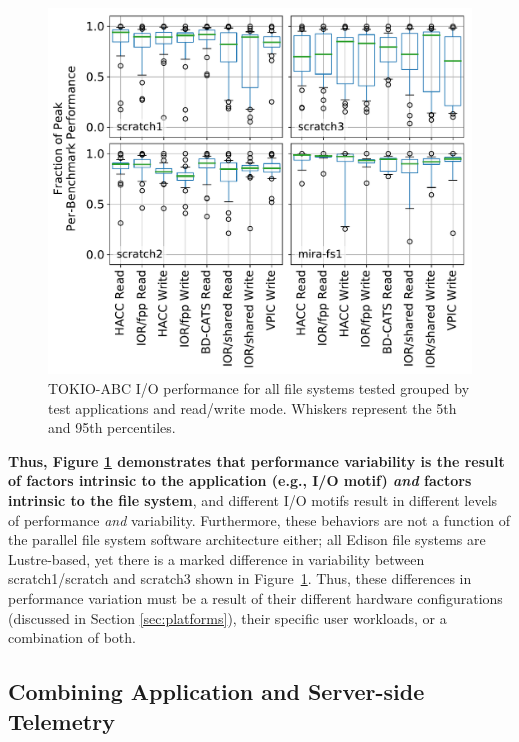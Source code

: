 \begin{figure}[t]
    \centering
    \includegraphics[width=1.0\columnwidth]{figs/perf-boxplots.pdf}
    \caption{TOKIO-ABC I/O performance for all file systems tested grouped by test
    applications and read/write mode.  Whiskers represent the 5th and 95th
    percentiles.}
    \label{fig:perf-summary-boxplots-motif}
\end{figure}

\textbf{Thus, Figure \ref{fig:perf-summary-boxplots-motif} demonstrates that 
performance variability is the result of factors intrinsic to the application (e.g., I/O motif) \emph{and} factors intrinsic to the file system}, and
different I/O motifs result in different levels of performance \emph{and} variability.
Furthermore, these behaviors are not a function of the parallel file system software architecture either; all Edison file systems are Lustre-based, yet there is a marked difference in variability between scratch1/scratch and scratch3 shown in Figure~\ref{fig:perf-summary-boxplots-motif}.
Thus, these differences in performance variation must be a result of their different hardware configurations (discussed in Section \ref{sec:platforms}), their specific user workloads, or a combination of both.

\subsection{Combining Application and Server-side Telemetry} \label{sec:results/combining}

